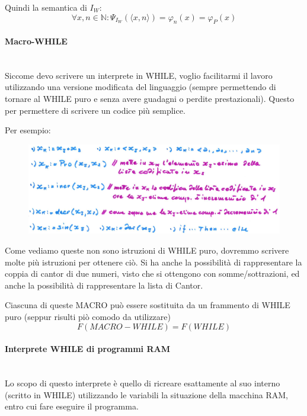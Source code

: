 \documentclass{article}
\begin{document}
Quindi la semantica di $I_W$:
$$\forall x,n\in\mathbb{N}:\Psi_{I_W}(\langle x,n\rangle)=\varphi_n(x)=\varphi_P(x)$$

\paragraph{Macro-WHILE}\mbox{}\\
Siccome devo scrivere un interprete in WHILE, voglio facilitarmi il lavoro utilizzando una
versione modificata del linguaggio (sempre permettendo di tornare al WHILE puro e senza
avere guadagni o perdite prestazionali). Questo per permettere di scrivere un codice
più semplice.

Per esempio:
\begin{figure}[H]
    \centering
    \includegraphics[scale=0.5]{images/macro-while.png}
\end{figure}

Come vediamo queste non sono istruzioni di WHILE puro, dovremmo scrivere molte più istruzioni
per ottenere ciò. Si ha anche la possibilità di rappresentare la coppia di cantor di due numeri,
visto che si ottengono con somme/sottrazioni, ed anche la possibilità di rappresentare la
lista di Cantor.

Ciascuna di queste MACRO può essere sostituita da un frammento di WHILE puro (seppur risulti piò comodo
da utilizzare)
$$F(MACRO-WHILE)=F(WHILE)$$

\paragraph{Interprete WHILE di programmi RAM}\mbox{}\\
Lo scopo di questo interprete è quello di ricreare esattamente al suo interno (scritto
in WHILE) utilizzando le variabili la situazione della macchina RAM, entro cui fare
eseguire il programma.
\end{document}
